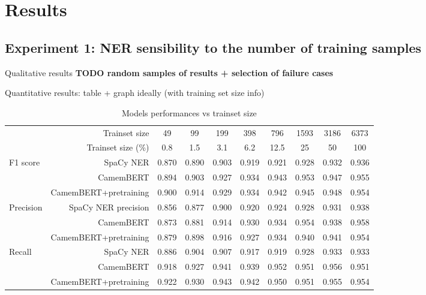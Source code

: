 \section{Results}

\subsection{Experiment 1: NER sensibility to the number of training samples}

Qualitative results
\textbf{TODO random samples of results + selection of failure cases}


Quantitative results: table + graph ideally (with training set size info)

\begin{table}[!h]
\caption{Models performances vs trainset size}
\centering
\begin{tabular}[t]{lr|cccccccc|}
\toprule
 & Trainset size & 49 & 99 & 199 & 398 & 796 & 1593 & 3186 & 6373\\
 & Trainset size (\%) & 0.8 & 1.5 & 3.1 & 6.2 & 12.5 & 25 & 50 & 100\\
 \hline \hline
\multirow{3}{*}{F1 score} & SpaCy NER & 0.870 & 0.890 & 0.903 & 0.919 & 0.921 & 0.928 & 0.932 & 0.936\\
& CamemBERT & 0.894 & 0.903 & 0.927 & 0.934 & 0.943 & 0.953 & 0.947 & 0.955\\
& CamemBERT+pretraining & 0.900 & 0.914 & 0.929 & 0.934 & 0.942 & 0.945 & 0.948 & 0.954\\
\midrule
\multirow{3}{*}{Precision} & SpaCy NER precision & 0.856 & 0.877 & 0.900 & 0.920 & 0.924 & 0.928 & 0.931 & 0.938\\
& CamemBERT & 0.873 & 0.881 & 0.914 & 0.930 & 0.934 & 0.954 & 0.938 & 0.958\\
& CamemBERT+pretraining & 0.879 & 0.898 & 0.916 & 0.927 & 0.934 & 0.940 & 0.941 & 0.954\\
\midrule
\multirow{3}{*}{Recall} & SpaCy NER & 0.886 & 0.904 & 0.907 & 0.917 & 0.919 & 0.928 & 0.933 & 0.933\\
& CamemBERT & 0.918 & 0.927 & 0.941 & 0.939 & 0.952 & 0.951 & 0.956 & 0.951\\
& CamemBERT+pretraining & 0.922 & 0.930 & 0.943 & 0.942 & 0.950 & 0.951 & 0.955 & 0.954\\
\bottomrule
\end{tabular}
\end{table}


